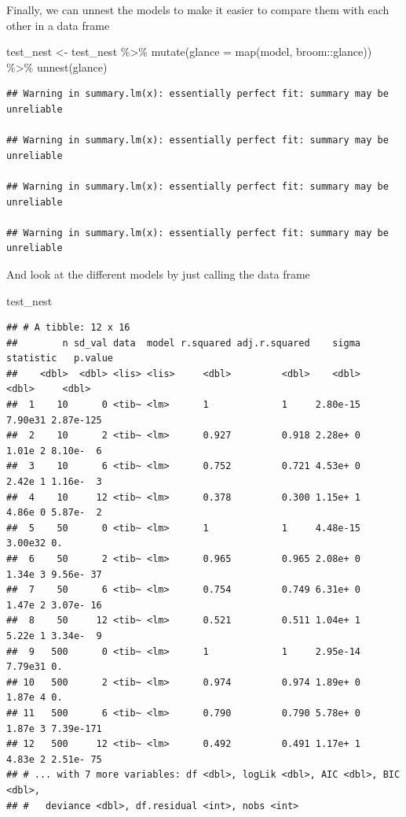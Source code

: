 \documentclass[
]{book}
\newenvironment{Shaded}{\begin{snugshade}}{\end{snugshade}}
\newcommand{\AttributeTok}[1]{\textcolor[rgb]{0.77,0.63,0.00}{#1}}
\newcommand{\FunctionTok}[1]{\textcolor[rgb]{0.00,0.00,0.00}{#1}}
\newcommand{\NormalTok}[1]{#1}
\newcommand{\OtherTok}[1]{\textcolor[rgb]{0.56,0.35,0.01}{#1}}
\newcommand{\SpecialCharTok}[1]{\textcolor[rgb]{0.00,0.00,0.00}{#1}}
\begin{document}
Finally, we can unnest the models to make it easier to compare them with each other in a data frame

\begin{Shaded}
\begin{Highlighting}[]
\NormalTok{test\_nest }\OtherTok{\textless{}{-}}\NormalTok{ test\_nest }\SpecialCharTok{\%\textgreater{}\%} 
  \FunctionTok{mutate}\NormalTok{(}\AttributeTok{glance =} \FunctionTok{map}\NormalTok{(model, broom}\SpecialCharTok{::}\NormalTok{glance)) }\SpecialCharTok{\%\textgreater{}\%} 
  \FunctionTok{unnest}\NormalTok{(glance)}
\end{Highlighting}
\end{Shaded}

\begin{verbatim}
## Warning in summary.lm(x): essentially perfect fit: summary may be unreliable

## Warning in summary.lm(x): essentially perfect fit: summary may be unreliable

## Warning in summary.lm(x): essentially perfect fit: summary may be unreliable

## Warning in summary.lm(x): essentially perfect fit: summary may be unreliable
\end{verbatim}

And look at the different models by just calling the data frame

\begin{Shaded}
\begin{Highlighting}[]
\NormalTok{test\_nest}
\end{Highlighting}
\end{Shaded}

\begin{verbatim}
## # A tibble: 12 x 16
##        n sd_val data  model r.squared adj.r.squared    sigma statistic   p.value
##    <dbl>  <dbl> <lis> <lis>     <dbl>         <dbl>    <dbl>     <dbl>     <dbl>
##  1    10      0 <tib~ <lm>      1             1     2.80e-15   7.90e31 2.87e-125
##  2    10      2 <tib~ <lm>      0.927         0.918 2.28e+ 0   1.01e 2 8.10e-  6
##  3    10      6 <tib~ <lm>      0.752         0.721 4.53e+ 0   2.42e 1 1.16e-  3
##  4    10     12 <tib~ <lm>      0.378         0.300 1.15e+ 1   4.86e 0 5.87e-  2
##  5    50      0 <tib~ <lm>      1             1     4.48e-15   3.00e32 0.       
##  6    50      2 <tib~ <lm>      0.965         0.965 2.08e+ 0   1.34e 3 9.56e- 37
##  7    50      6 <tib~ <lm>      0.754         0.749 6.31e+ 0   1.47e 2 3.07e- 16
##  8    50     12 <tib~ <lm>      0.521         0.511 1.04e+ 1   5.22e 1 3.34e-  9
##  9   500      0 <tib~ <lm>      1             1     2.95e-14   7.79e31 0.       
## 10   500      2 <tib~ <lm>      0.974         0.974 1.89e+ 0   1.87e 4 0.       
## 11   500      6 <tib~ <lm>      0.790         0.790 5.78e+ 0   1.87e 3 7.39e-171
## 12   500     12 <tib~ <lm>      0.492         0.491 1.17e+ 1   4.83e 2 2.51e- 75
## # ... with 7 more variables: df <dbl>, logLik <dbl>, AIC <dbl>, BIC <dbl>,
## #   deviance <dbl>, df.residual <int>, nobs <int>
\end{verbatim}
\end{document}
